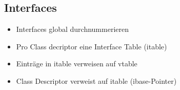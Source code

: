 \subsection{Interfaces}
\begin{itemize}[topsep=0pt]
    \itemsep -0.2em
    \item Interfaces global durchnummerieren
    \item Pro Class decriptor eine Interface Table (itable)
    \item Einträge in itable verweisen auf vtable
    \item Class Descriptor verweist auf itable (ibase-Pointer)
\end{itemize}